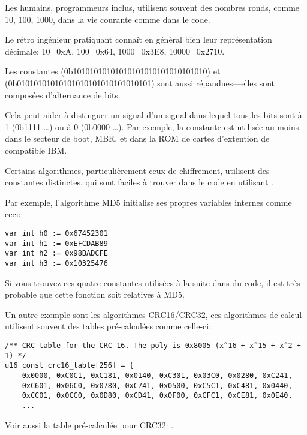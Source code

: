 ﻿

Les humains, programmeurs inclus, utilisent souvent des nombres ronds, comme 10, 100,
1000, dans la vie courante comme dans le code.

Le rétro ingénieur pratiquant connaît en général bien leur représentation décimale:
10=0xA, 100=0x64, 1000=0x3E8, 10000=0x2710.

Les constantes  (0b10101010101010101010101010101010) et \\
 (0b01010101010101010101010101010101)  sont aussi répandues---elles
sont composées d'alternance de bits.

Cela peut aider à distinguer un signal d'un signal dans lequel tous les bits sont
à 1 (0b1111 \dots) ou à 0 (0b0000 \dots).
Par exemple, la constante  est utilisée au moins dans le secteur de boot,
\ac{MBR}, et dans la \ac{ROM} de cartes d'extention de compatible IBM.

Certains algorithmes, particulièrement ceux de chiffrement, utilisent des constantes
distinctes, qui sont faciles à trouver dans le code en utilisant \IDA.


Par exemple, l'algorithme MD5 initialise ses propres
variables internes comme ceci:

\begin{verbatim}
var int h0 := 0x67452301
var int h1 := 0xEFCDAB89
var int h2 := 0x98BADCFE
var int h3 := 0x10325476
\end{verbatim}

Si vous trouvez ces quatre constantes utilisées à la suite dans du code, il est
très probable que cette fonction soit relatives à MD5.

\par Un autre exemple sont les algorithmes CRC16/CRC32, ces algorithmes de calcul
utilisent souvent des tables pré-calculées comme celle-ci:

\begin{lstlisting}[caption=linux/lib/crc16.c,style=customc]
/** CRC table for the CRC-16. The poly is 0x8005 (x^16 + x^15 + x^2 + 1) */
u16 const crc16_table[256] = {
	0x0000, 0xC0C1, 0xC181, 0x0140, 0xC301, 0x03C0, 0x0280, 0xC241,
	0xC601, 0x06C0, 0x0780, 0xC741, 0x0500, 0xC5C1, 0xC481, 0x0440,
	0xCC01, 0x0CC0, 0x0D80, 0xCD41, 0x0F00, 0xCFC1, 0xCE81, 0x0E40,
	...
\end{lstlisting}

Voir aussi la table pré-calculée pour CRC32: .

